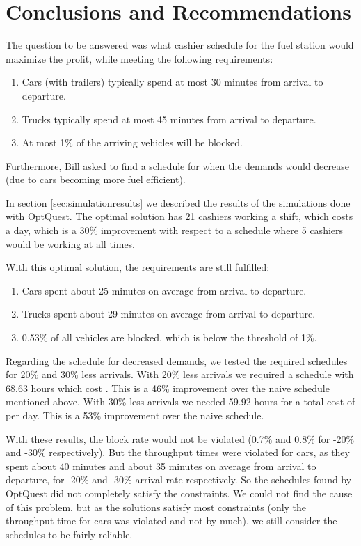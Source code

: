 \section{Conclusions and Recommendations}
The question to be answered was what cashier schedule for the fuel station would maximize the profit, while meeting the following requirements:
\begin{enumerate}
	\item Cars (with  trailers) typically spend at most 30 minutes from arrival to departure.
	\item Trucks typically spend at most 45 minutes from arrival to departure.
	\item At most 1$\%$ of the arriving vehicles will be blocked.
\end{enumerate}
Furthermore, Bill asked to find a schedule for when the demands would decrease (due to cars becoming more fuel efficient).

In section \ref{sec:simulationresults} we described the results of the simulations done with OptQuest. The optimal solution has 21 cashiers working a shift, which costs  a day, which is a 30$\%$ improvement with respect to a schedule where 5 cashiers would be working at all times.

With this optimal solution, the requirements are still fulfilled:
\begin{enumerate}
	\item Cars spent about 25 minutes on average from arrival to departure.
	\item Trucks spent about 29 minutes on average from arrival to departure.
	\item 0.53$\%$ of all vehicles are blocked, which is below the threshold of 1$\%$.
\end{enumerate}

Regarding the schedule for decreased demands, we tested the required schedules for 20$\%$ and 30$\%$ less arrivals. With 20$\%$ less arrivals we required a schedule with 68.63 hours which cost . This is a 46$\%$ improvement over the naive schedule mentioned above. With 30$\%$ less arrivals we needed 59.92 hours for a total cost of  per day. This is a 53$\%$ improvement over the naive schedule. 

With these results, the block rate would not be violated (0.7$\%$ and 0.8$\%$ for -20$\%$ and -30$\%$ respectively). But the throughput times were  violated for cars, as they spent about 40 minutes and about 35 minutes on average from arrival to departure, for -20$\%$ and -30$\%$ arrival rate respectively. So the schedules found by OptQuest did not completely satisfy the constraints. We could not find the cause of this problem, but as the solutions satisfy most constraints (only the throughput time for cars was violated and not by much), we still consider the schedules to be fairly reliable.

